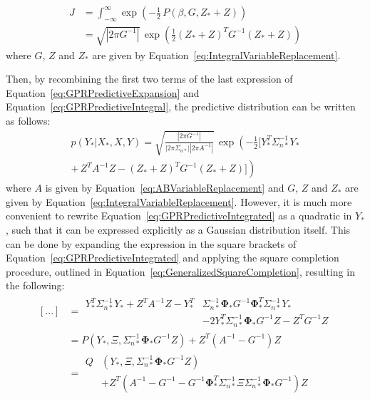 \documentclass{article}
\begin{document}
\begin{equation}
\label{eq:GPRPredictiveIntegral}
	\begin{aligned}
	J &= \int_{-\infty}^{\infty} \exp\!\left(-\frac{1}{2} \, P\!\left(\beta,G,Z_* + Z\right)\right) \\
	&= \sqrt{\left|2 \pi G^{-1}\right|} \, \exp\left(\frac{1}{2} \left(Z_* + Z\right)^T G^{-1} \left(Z_* + Z\right)\right)
	\end{aligned}
\end{equation}
where $G$, $Z$ and $Z_*$ are given by Equation~\eqref{eq:IntegralVariableReplacement}.

Then, by recombining the first two terms of the last expression of Equation~\eqref{eq:GPRPredictiveExpansion} and Equation~\eqref{eq:GPRPredictiveIntegral}, the predictive distribution can be written as follows:
\begin{multline}
\label{eq:GPRPredictiveIntegrated}
	p\!\left(Y_*|X_*,X,Y\right) = \sqrt{\frac{\left|2 \pi G^{-1}\right|}{\left|2 \pi \Sigma_{n*}\right| \left|2 \pi A^{-1}\right|}} \, \exp\!\left(-\frac{1}{2} \biggl[Y_*^T \Sigma_{n*}^{-1} Y_*\right. \\
	\left.+ \, Z^T A^{-1} Z - \left(Z_* + Z\right)^T G^{-1} \left(Z_* + Z\right)\biggr]\right)
\end{multline}
where $A$ is given by Equation~\eqref{eq:ABVariableReplacement} and $G$, $Z$ and $Z_*$ are given by Equation~\eqref{eq:IntegralVariableReplacement}. However, it is much more convenient to rewrite Equation~\eqref{eq:GPRPredictiveIntegrated} as a quadratic in $Y_*$, such that it can be expressed explicitly as a Gaussian distribution itself. This can be done by expanding the expression in the square brackets of Equation~\eqref{eq:GPRPredictiveIntegrated} and applying the square completion procedure, outlined in Equation~\eqref{eq:GeneralizedSquareCompletion}, resulting in the following:
\begin{equation}
\label{eq:GPRPredictiveSquareCompletion}
	\begin{aligned}
	\left[...\right] &=
	\begin{split}
	Y_*^T \Sigma_{n*}^{-1} Y_* + Z^T A^{-1} Z - Y_*^T &\Sigma_{n*}^{-1} \mathbf{\Phi}_* G^{-1} \mathbf{\Phi}_*^T \Sigma_{n*}^{-1} Y_* \\
	&- 2 Y_*^T \Sigma_{n*}^{-1} \mathbf{\Phi}_* G^{-1} Z - Z^T G^{-1} Z
	\end{split}
	\\
	&= P\!\left(Y_*,\Xi,\Sigma_{n*}^{-1} \mathbf{\Phi}_* G^{-1} Z\right) + Z^T \! \left(A^{-1} - G^{-1}\right) Z \\
	&=
	\begin{split}
	Q\!&\left(Y_*,\Xi,\Sigma_{n*}^{-1} \mathbf{\Phi}_* G^{-1} Z\right) \\
	&+ Z^T \! \left(A^{-1} - G^{-1} - G^{-1} \mathbf{\Phi}_*^T \Sigma_{n*}^{-1} \Xi \Sigma_{n*}^{-1} \mathbf{\Phi}_* G^{-1}\right) Z
	\end{split}
	\end{aligned}
\end{equation}
\end{document}
